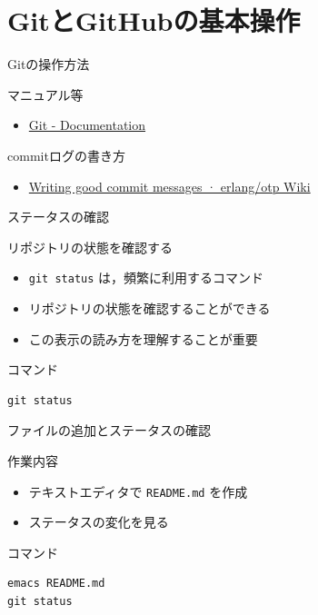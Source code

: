 \documentclass[t, aspectratio=169]{beamer}
\begin{document}
\section{GitとGitHubの基本操作}
\label{sec-2-3}
\begin{frame}[label=sec-2-3-1]{Gitの操作方法}
\begin{block}{マニュアル等}
\begin{itemize}
\item \href{http://git-scm.com/doc}{Git - Documentation}
\end{itemize}
\end{block}
\begin{block}{commitログの書き方}
\begin{itemize}
\item \href{https://github.com/erlang/otp/wiki/Writing-good-commit-messages}{Writing good commit messages · erlang/otp Wiki}
\end{itemize}
\end{block}
\end{frame}
\begin{frame}[fragile,label=sec-2-3-2]{ステータスの確認}
 \begin{block}{リポジトリの状態を確認する}
\begin{itemize}
\item \texttt{git status} は，頻繁に利用するコマンド
\item リポジトリの状態を確認することができる
\item この表示の読み方を理解することが重要
\end{itemize}
\end{block}
\begin{block}{コマンド}
\begin{verbatim}
git status
\end{verbatim}
\end{block}
\end{frame}

\begin{frame}[fragile,label=sec-2-3-3]{ファイルの追加とステータスの確認}
 \begin{block}{作業内容}
\begin{itemize}
\item テキストエディタで \texttt{README.md} を作成
\item ステータスの変化を見る
\end{itemize}
\end{block}
\begin{block}{コマンド}
\begin{verbatim}
emacs README.md
git status
\end{verbatim}
\end{block}
\end{frame}
\end{document}
